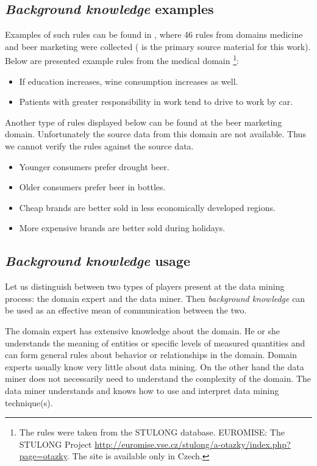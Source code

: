 \documentclass{llncs}
\begin{document}
\subsection{\emph{Background knowledge} examples}
\label{section:bkexamples}
Examples of such rules can be found in \cite{Diplomka}, where 46 rules from 
domains medicine and beer marketing were collected (\cite{Diplomka} is the primary
source material for this work). Below are presented example rules from the medical domain
\footnote{The rules were taken from the STULONG database. EUROMISE: The STULONG Project
\url{http://euromise.vse.cz/stulong/a-otazky/index.php?page=otazky}. The site is
available only in Czech.}:

\begin{itemize}
\item If education increases, wine consumption increases as well.
\item Patients with greater responsibility in work tend to drive to work by car.
\end{itemize}

Another type of rules displayed below can be found at the beer marketing domain. 
Unfortunately the source data from this domain are not available. Thus we 
cannot verify the rules against the source data.

\begin{itemize}
\item Younger consumers prefer drought beer.
\item Older consumers prefer beer in bottles.
\item Cheap brands are better sold in less economically developed regions.
\item More expensive brands are better sold during holidays.
\end{itemize}

\subsection{\emph{Background knowledge} usage}
Let us distinguish between two types of players present at the data mining process: 
the domain expert and the data miner. Then \emph{background knowledge} can be used
as an effective mean of communication between the two. 

The domain expert has extensive knowledge about the domain. He or she understands 
the meaning of entities or specific levels of measured quantities and can form 
general rules about behavior or relationships in the domain. Domain experts usually know
very little about data mining. On the other hand the data miner does not 
necessarily need to understand the complexity of the domain. The data miner understands
and knows how to use and interpret data mining technique(s).
\end{document}
